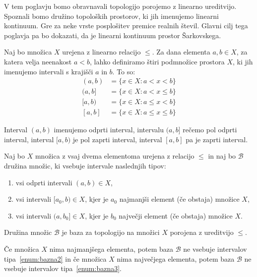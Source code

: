 \documentclass[../TG_magistrsko_delo_sections.tex]{subfiles}
\begin{document}
V tem poglavju bomo obravnavali topologijo porojemo z linearno ureditvijo. Spoznali bomo družino topoloških prostorov, ki jih imenujemo linearni kontinuum. Gre za neke vrste posplošitev premice realnih števil. Glavni cilj tega poglavja pa bo dokazati, da je linearni kontinuum prostor Šarkovskega.

Naj bo množica $X$ urejena z linearno relacijo $\leq$. Za dana elementa $a, b \in X$, za katera velja neenakost $a<b$, lahko definiramo štiri podmnožice prostora $X$, ki jih imenujemo intervali s krajišči $a$ in $b$. To so:
\begin{equation*} %
\begin{split}
(a, b) &= \{x \in X: a< x <b\} \\ 
(a, b] &= \{x \in X: a< x \leq b\} \\ 
[a, b) &= \{x \in X: a \leq x< b\} \\ 
[a, b] &= \{x \in X: a \leq x \leq b\}
\end{split}
\end{equation*}

\begin{opomba}\label{op:intervali}
Interval $(a, b)$ imenujemo odprti interval, intervalu $(a, b]$ rečemo pol odprti interval, interval $[a, b)$ je pol zaprti interval, interval $[a, b]$ pa je zaprti interval.
\end{opomba}

\begin{definicija}
Naj bo $X$ množica z vsaj dvema elementoma urejena z relacijo $\leq$ in naj bo $\mathcal{B}$ družina množic, ki vsebuje intervale naslednjih tipov:
\begin{enumerate}
\item vsi odprti intervali $(a, b) \in X$, \label{enum:bazna1}
\item vsi intervali $[a_0, b) \in X$, kjer je $a_0$ najmanjši element (če obstaja) množice $X$, \label{enum:bazna2}
\item vsi intervali $(a, b_0] \in X$, kjer je $b_0$ največji element (če obstaja) množice $X$. \label{enum:bazna3}
\end{enumerate}
Družina množic $\mathcal{B}$ je baza za topologijo na množici $X$ porojena z ureditvijo $\leq$.
\end{definicija}

\begin{opomba}\label{op:ekstremi}
Če množica $X$ nima najmanjšega elementa, potem baza $\mathcal{B}$ ne vsebuje intervalov tipa~\ref{enum:bazna2} in če množica $X$ nima največjega elementa, potem baza $\mathcal{B}$ ne vsebuje intervalov tipa~\ref{enum:bazna3}.
\end{opomba}
\end{document}
